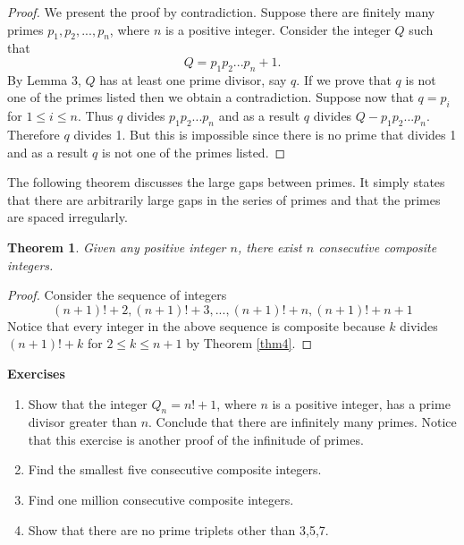 \documentclass[12pt,letterpaper]{book}
\newtheorem{theorem}{Theorem}
\begin{document}
\begin{proof}
We present the proof by contradiction.  Suppose there are finitely
many primes $p_1, p_2, ...,p_n$, where $n$ is a positive integer.
Consider the integer $Q$ such that
\begin{equation*}
Q=p_1p_2...p_n+1.
\end{equation*}
By Lemma 3, $Q$ has at least one prime divisor, say $q$.  If we prove
that $q$ is not one of the primes listed then we obtain a
contradiction.  Suppose now that $q=p_i$ for $1\leq i\leq n$. Thus
$q$ divides $p_1p_2...p_n$ and as a result $q$ divides
$Q-p_1p_2...p_n$.  Therefore $q$ divides 1.  But this is impossible
since there is no prime that divides 1 and as a result $q$ is not
one of the primes listed.
\end{proof}
The following theorem discusses the large gaps between primes.  It
simply states that there are arbitrarily large gaps in the series of
primes and that the primes are spaced irregularly.

\begin{theorem}
Given any positive integer $n$, there exist $n$ consecutive
composite integers.
\end{theorem}

\begin{proof}
Consider the sequence of integers
\begin{equation*}
(n+1)!+2, (n+1)!+3,...,(n+1)!+n, (n+1)!+n+1
\end{equation*}
Notice that every integer in the above sequence is composite because
$k$ divides $(n+1)!+k$ for $2\leq k\leq n+1$ by Theorem \ref{thm4}.
\end{proof}

\textbf{Exercises}
\begin{enumerate}
\item{Show that the integer $Q_n=n!+1$, where $n$ is a positive
integer, has a prime divisor greater than $n$.  Conclude that there
are infinitely many primes.  Notice that this exercise is another
proof of the infinitude of primes.} \item{Find the smallest five
consecutive composite integers.}\item{Find one million consecutive
composite integers.}\item{Show that there are no prime triplets
other than 3,5,7.}
\end{enumerate}

\newpage
\end{document}
